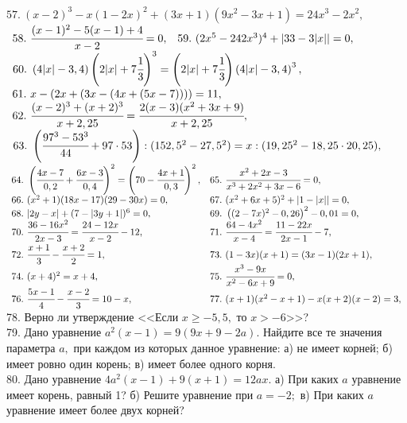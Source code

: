 $57.\ (x-2)^3-x(1-2x)^2+(3x+1)(9x^2-3x+1)=24x^3-2x^2,$\\
$\begin{array}{ll}58.\ \cfrac{(x-1)^2-5(x-1)+4}{x-2}=0,&
59.\ (2x^5-242x^3)^4+\left |33-3|x|\right|=0,\end{array}$\\$\begin{array}{l}
60.\ \left(4|x|-3,4\right)\left(2|x|+7\cfrac{1}{3}\right)^3=\left(2|x|+7\cfrac{1}{3}\right)\left(4|x|-3,4\right)^3,\\
\end{array}$\\
$\begin{array}{ll}
61.\ x-(2x+(3x-(4x+(5x-7))))=11,\\
62.\ \cfrac{(x-2)^3+(x+2)^3}{x+2,25}=\cfrac{2(x-3)(x^2+3x+9)}{x+2,25},\end{array}$\\
$\begin{array}{l}
63.\ \left(\cfrac{97^3-53^3}{44}+97\cdot 53\right): (152,5^2-27,5^2)=x:(19,25^2-18,25\cdot20,25),
\end{array}$\\
$\begin{array}{ll}
64.\ \left(\cfrac{4x-7}{0,2}+\cfrac{6x-3}{0,4}\right)^2=\left(70-\cfrac{4x+1}{0,3}\right)^2,&
65.\ \cfrac{x^2+2x-3}{x^3+2x^2+3x-6}=0,\\
66.\ (x^2+1)(18x-17)(29-30x)=0,&
67.\ (x^2+6x+5)^2+\left|1-|x|\right|=0,\\
68.\ |2y-x|+(7-|3y+1|)^6=0,&
69.\ \left((2-7x)^2-0,26\right)^2-0,01=0,\\
70.\ \cfrac{36-16x^2}{2x-3}=\cfrac{24-12x}{x-2}-12,&
71.\ \cfrac{64-4x^2}{x-4}=\cfrac{11-22x}{2x-1}-7,\\
72.\ \cfrac{x+1}{3}-\cfrac{x+2}{2}=1,&
73.\ (1-3x)(x+1)=(3x-1)(2x+1),\\
74.\ (x+4)^2=x+4,&
75.\ \cfrac{x^3-9x}{x^2-6x+9}=0,\\
76.\ \cfrac{5x-1}{4}-\cfrac{x-2}{3}=10-x,&
77.\ (x+1)(x^2-x+1)-x(x+2)(x-2)=3,
\end{array}$\\
78. Верно ли утверждение <<Если $x\geqslant-5,5,$ то $x>-6$>>?\\
79. Дано уравнение $a^2(x-1)=9(9x+9-2a).$ Найдите все те значения параметра $a,$ при каждом из которых данное уравнение: а) не имеет корней; б) имеет ровно один корень; в) имеет более одного корня.\\
80. Дано уравнение $4a^2(x-1)+9(x+1)=12ax.$ а) При каких $a$ уравнение имеет корень, равный 1? б) Решите уравнение при $a=-2;$ в) При каких $a$ уравнение имеет более двух корней?\\

